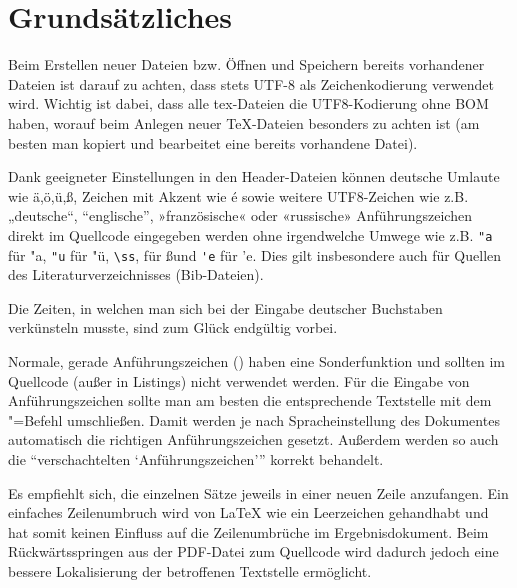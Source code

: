 \section[Grundsätzliches]{Grundsätzliches}%
\label{sec:Grundsätzliches}
%
Beim Erstellen neuer Dateien bzw. Öffnen und Speichern bereits vorhandener Dateien ist darauf zu achten,
dass stets UTF-8 als Zeichenkodierung verwendet wird.
Wichtig ist dabei, dass alle tex-Dateien die UTF8-Kodierung ohne BOM haben,
worauf beim Anlegen neuer TeX-Dateien besonders zu achten ist
(am besten man kopiert und bearbeitet eine bereits vorhandene Datei).

Dank geeigneter Einstellungen in den Header-Dateien können deutsche Umlaute wie 
%
ä,ö,ü,ß, Zeichen mit Akzent wie é sowie weitere UTF8-Zeichen wie z.B.
%
%
„deutsche“, “englische”, »französische« oder «russische» Anführungszeichen 
direkt im Quellcode eingegeben werden ohne irgendwelche Umwege wie z.B. 
\verb+"a+ für "a,
\verb+"u+ für "ü,
\verb+\ss+, für \ss und
\verb+'e+ für 'e.
Dies gilt insbesondere auch für Quellen des Literaturverzeichnisses (Bib-Dateien).

Die Zeiten, in welchen man sich bei der Eingabe deutscher Buchstaben verkünsteln musste,
sind zum Glück endgültig vorbei.

Normale, gerade Anführungszeichen (\texttt{{\dq}}) haben eine Sonderfunktion und sollten im Quellcode (außer in Listings) nicht verwendet werden.
Für die Eingabe von Anführungszeichen sollte man am besten die entsprechende Textstelle mit dem "=Befehl umschließen.
Damit werden je nach Spracheinstellung des Dokumentes automatisch die richtigen Anführungszeichen gesetzt.
Außerdem werden so auch die \enquote{verschachtelten \enquote{Anführungszeichen}} korrekt behandelt.

Es empfiehlt sich, die einzelnen Sätze jeweils in einer neuen Zeile anzufangen.
Ein einfaches Zeilenumbruch wird von LaTeX wie ein Leerzeichen gehandhabt
und hat somit keinen Einfluss auf die Zeilenumbrüche im Ergebnisdokument.
Beim Rückwärtsspringen aus der PDF-Datei zum Quellcode wird dadurch jedoch
eine bessere Lokalisierung der betroffenen Textstelle ermöglicht.